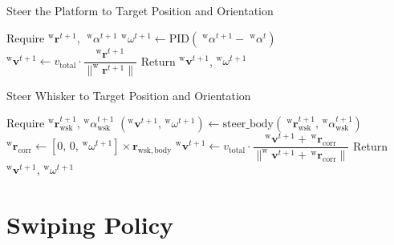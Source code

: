 \begin{algorithm}[htb]
    \caption{Steer the Platform to Target Position and Orientation}
    \begin{algorithmic}
        \State Require \(^{\mathrm{w}}\boldsymbol{r}^{t+1}\), \(\;^{\mathrm{w}}\alpha^{t+1}\)
        \State \(^{\mathrm{w}}\omega^{t+1} \gets \mathrm{PID}(\;^{\mathrm{w}}\alpha^{t+1} - \;^{\mathrm{w}}\alpha^{t})\)
        \State \(^{\mathrm{w}}\boldsymbol{v}^{t+1} \gets v_{\mathrm{total}} \cdot \dfrac{^{\mathrm{w}}\boldsymbol{r}^{t+1}}{\|^{\mathrm{w}}\boldsymbol{r}^{t+1}\|}\)
        \State Return \(^{\mathrm{w}}\boldsymbol{v}^{t+1}\), \(^{\mathrm{w}}\omega^{t+1}\)
    \end{algorithmic}
    \label{alg:steer_platform}
\end{algorithm}

\begin{algorithm}[htb]
    \caption{Steer Whisker to Target Position and Orientation}
    \begin{algorithmic}
        \State Require \(^{\mathrm{w}}\boldsymbol{r}_{\mathrm{wsk}}^{t+1}\), \(^{\mathrm{w}}\alpha_{\mathrm{wsk}}^{t+1}\)
        \State \((^{\mathrm{w}}\boldsymbol{v}^{t+1},\, ^{\mathrm{w}}\omega^{t+1}) \gets \mathrm{steer\_body}(\;^{\mathrm{w}}\boldsymbol{r}_{\mathrm{wsk}}^{t+1},\, ^{\mathrm{w}}\alpha_{\mathrm{wsk}}^{t+1})\)
        \State \(^{\mathrm{w}}\boldsymbol{r}_{\mathrm{corr}} \gets [0,\,0,\,^{\mathrm{w}}\omega^{t+1}] \times \boldsymbol{r}_{\mathrm{wsk, body}}\) 
        \State \(^{\mathrm{w}}\boldsymbol{v}^{t+1} \gets v_{\mathrm{total}} \cdot \dfrac{^{\mathrm{w}}\boldsymbol{v}^{t+1} + \,^{\mathrm{w}}\boldsymbol{r}_{\mathrm{corr}}}{\|^{\mathrm{w}}\boldsymbol{v}^{t+1} + \,^{\mathrm{w}}\boldsymbol{r}_{\mathrm{corr}}\|}\)
        \State Return \(^{\mathrm{w}}\boldsymbol{v}^{t+1}\), \(^{\mathrm{w}}\omega^{t+1}\)
    \end{algorithmic}
    \label{alg:steer_whisker}
\end{algorithm}


\section{Swiping Policy}

